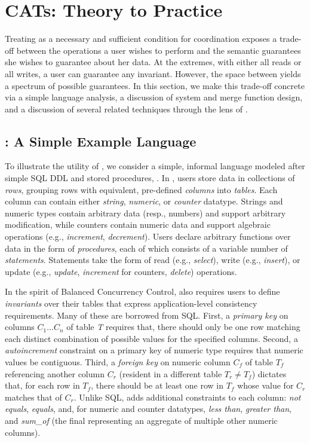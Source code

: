 
\section{CATs: Theory to Practice}
\label{sec:bcc-practice}

Treating \iconfluence as a necessary and sufficient condition for
coordination exposes a trade-off between the operations a user wishes
to perform and the semantic guarantees she wishes to guarantee about
her data. At the extremes, with either all reads or all writes, a user
can guarantee any invariant. However, the space between yields a
spectrum of possible \iconfluent guarantees. In this section, we make
this trade-off concrete via a simple language analysis, a discussion
of system and merge function design, and a discussion of several
related techniques through the lens of \iconfluence.

\subsection{\lang: A Simple Example Language}

To illustrate the utility of \iconfluence, we consider a
simple, informal language modeled after simple SQL DDL and stored
procedures, \lang. In \lang, users store data in collections of
\textit{rows}, grouping rows with equivalent, pre-defined
\textit{columns} into \textit{tables}. Each column can contain either
\textit{string}, \textit{numeric}, or \textit{counter}
datatype. Strings and numeric types contain arbitrary data (resp.,
numbers) and support arbitrary modification, while counters contain
numeric data and support algebraic operations (e.g.,
\textit{increment}, \textit{decrement}). Users declare arbitrary
functions over data in the form of \textit{procedures}, each of which
consists of a variable number of \textit{statements}. Statements take
the form of read (e.g., \textit{select}), write (e.g.,
\textit{insert}), or update (e.g., \textit{update}, \textit{increment}
for counters, \textit{delete}) operations.

In the spirit of Balanced Concurrency Control, \lang also requires
users to define \textit{invariants} over their tables that express
application-level consistency requirements. Many of these are borrowed
from SQL. First, a \textit{primary key} on columns $C_1 \dots C_n$ of
table \textit{T} requires that, there should only be one row matching
each distinct combination of possible values for the specified
columns. Second, a \textit{autoincrement} constraint on a primary key
of numeric type requires that numeric values be contiguous. Third, a
\textit{foreign key} on numeric column $C_f$ of table $T_f$
referencing another column $C_r$ (resident in a different table $T_r
\neq T_f$) dictates that, for each row in $T_f$, there should be at
least one row in $T_f$ whose value for $C_r$ matches that of
$C_r$. Unlike SQL, \lang adds additional constraints to each column:
\textit{not equals}, \textit{equals}, and, for numeric and counter
datatypes, \textit{less than}, \textit{greater than}, and
\textit{sum\_of} (the final representing an aggregate of multiple
other numeric columns).


